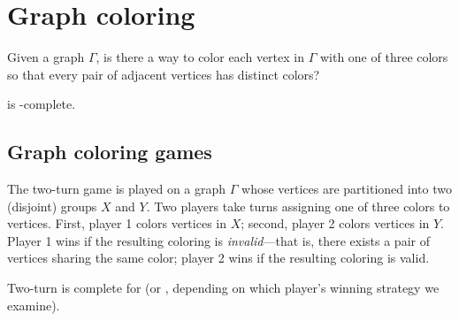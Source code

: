 \section{Graph coloring}

\begin{definition}%
  Given a graph \(\Gamma\), is there a way to color each vertex in  \(\Gamma\)
  with one of three colors so that every pair of adjacent vertices has distinct
  colors?
\end{definition}

\begin{theorem}
   is \NP-complete.
\end{theorem}

\subsection{Graph coloring games}

\begin{definition}%
  The two-turn  game is played on a graph \(\Gamma\) whose
  vertices are partitioned into two (disjoint) groups \(X\) and \(Y\).  Two
  players take turns assigning one of three colors to vertices.  First, player
  1 colors vertices in \(X\); second, player 2 colors vertices in \(Y\).
  Player 1 wins if the resulting coloring is \emph{invalid}---that is, there
  exists a pair of vertices sharing the same color; player 2 wins if the
  resulting coloring is valid.

\end{definition}

\begin{conjecture}
  Two-turn  is complete for  (or , depending on
  which player's winning strategy we examine).
\end{conjecture}


